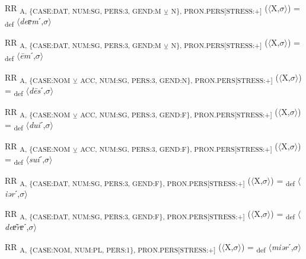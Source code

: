{\begin{exe}
 RR \textsubscript{A, \{CASE:DAT, NUM:SG, PERS:3, GEND:M} \textsubscript{${\veebar}$}\textsubscript{ N\}, PRON.PERS[STRESS:+]} ($\langle$X,$\sigma $$\rangle$) = \textsubscript{def} $\langle$\textit{deɐm}ˊ,$\sigma $$\rangle$
\end{exe}

\begin{exe}
  RR \textsubscript{A, \{CASE:DAT, NUM:SG, PERS:3, GEND:M} \textsubscript{${\veebar}$}\textsubscript{ N\}, PRON.PERS[STRESS:+]} ($\langle$X,$\sigma $$\rangle$) = \textsubscript{def} $\langle$\textit{\=em}ˊ,$\sigma $$\rangle$
\end{exe}

\begin{exe}
 RR \textsubscript{A, \{CASE:NOM} \textsubscript{${\veebar}$}\textsubscript{ ACC, NUM:SG, PERS:3, GEND:N\}, PRON.PERS[STRESS:+]} ($\langle$X,$\sigma $$\rangle$) = \textsubscript{def} $\langle$\textit{d\=es}ˊ,$\sigma $$\rangle$
\end{exe}

\begin{exe}
 RR \textsubscript{A, \{CASE:NOM} \textsubscript{${\veebar}$}\textsubscript{ ACC, NUM:SG, PERS:3, GEND:F\}, PRON.PERS[STRESS:+]} ($\langle$X,$\sigma $$\rangle$) = \textsubscript{def} $\langle$\textit{dui}ˊ,$\sigma $$\rangle$
\end{exe}

\begin{exe}
 RR \textsubscript{A, \{CASE:NOM} \textsubscript{${\veebar}$}\textsubscript{ ACC, NUM:SG, PERS:3, GEND:F\}, PRON.PERS[STRESS:+]} ($\langle$X,$\sigma $$\rangle$) = \textsubscript{def} $\langle$\textit{sui}ˊ,$\sigma $$\rangle$
\end{exe}

\begin{exe}
 RR \textsubscript{A, \{CASE:DAT, NUM:SG, PERS:3, GEND:F\}, PRON.PERS[STRESS:+]} ($\langle$X,$\sigma $$\rangle$) = \textsubscript{def} $\langle$\textit{iər}ˊ,$\sigma $$\rangle$
\end{exe}

\begin{exe}
 RR \textsubscript{A, \{CASE:DAT, NUM:SG, PERS:3, GEND:F\}, PRON.PERS[STRESS:+]} ($\langle$X,$\sigma $$\rangle$) = \textsubscript{def} $\langle$\textit{deɐ͂rɐ}ˊ,$\sigma $$\rangle$
\end{exe}

\begin{exe}
 RR \textsubscript{A, \{CASE:NOM, NUM:PL, PERS:1\}, PRON.PERS[STRESS:+]} ($\langle$X,$\sigma $$\rangle$) = \textsubscript{def} $\langle$\textit{miər}ˊ,$\sigma $$\rangle$
\end{exe}

}
